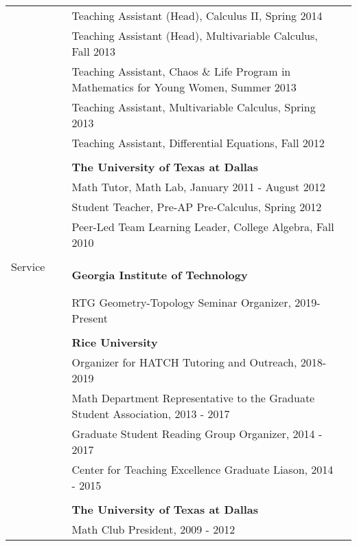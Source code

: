 \documentclass[letterpaper,11pt,oneside]{article}
\begin{document}
          \noindent \begin{tabular}{@{} l l l} 
    
        & Teaching Assistant (Head), Calculus II, Spring 2014 \\  
       & Teaching Assistant (Head), Multivariable Calculus, Fall 2013 \\
   & Teaching Assistant, Chaos \& Life Program in Mathematics for Young Women, Summer 2013 \\  
          & Teaching Assistant, Multivariable Calculus, Spring 2013 \\
       & Teaching Assistant, Differential Equations, Fall 2012 \\


       \Large{}   & \\
     &\textbf{The University of Texas at Dallas} \\
     & Math Tutor, Math Lab, January 2011 - August 2012 \\
     & Student Teacher, Pre-AP Pre-Calculus, Spring 2012 \\
          & Peer-Led Team Learning Leader, College Algebra, Fall 2010 \\
     & \\
     
     
     
            
       \Large{Service \ \ \ \ \ }       &\textbf{Georgia Institute of Technology} \\
        
       & RTG Geometry-Topology Seminar Organizer, 2019-Present\\
       \\
       
       &\textbf{Rice University} \\
       
       & Organizer for HATCH Tutoring and Outreach, 2018-2019\\
       
      & Math Department Representative to the Graduate Student Association, 2013 - 2017 \\
      & Graduate Student Reading Group Organizer, 2014 - 2017\\
     
&Center for Teaching Excellence Graduate Liason, 2014 - 2015\\
\\
    
   &\textbf{The University of Texas at Dallas} \\
 & Math Club President, 2009 - 2012 \\

 
\end{tabular}
\end{document}
